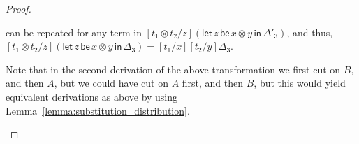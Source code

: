 \documentclass{elsarticle}
\newcommand{\FILLnt}[1]{\mathit{#1}}
\newcommand{\FILLmv}[1]{\mathit{#1}}
\newcommand{\FILLsym}[1]{#1}
\begin{document}
\begin{proof}
\begin{report}
\begin{itemize}
can be repeated for any term in $\FILLsym{[}   \FILLnt{t_{{\mathrm{1}}}}  \otimes  \FILLnt{t_{{\mathrm{2}}}}   \FILLsym{/}  \FILLmv{z}  \FILLsym{]}  \FILLsym{(}    \mathsf{let}\, \FILLmv{z} \,\mathsf{be}\,  \FILLmv{x}  \otimes  \FILLmv{y}  \,\mathsf{in}\, \Delta'_{{\mathrm{3}}}    \FILLsym{)}$, and thus, $\FILLsym{[}   \FILLnt{t_{{\mathrm{1}}}}  \otimes  \FILLnt{t_{{\mathrm{2}}}}   \FILLsym{/}  \FILLmv{z}  \FILLsym{]}  \FILLsym{(}    \mathsf{let}\, \FILLmv{z} \,\mathsf{be}\,  \FILLmv{x}  \otimes  \FILLmv{y}  \,\mathsf{in}\, \Delta_{{\mathrm{3}}}    \FILLsym{)}  \FILLsym{=}  \FILLsym{[}  \FILLnt{t_{{\mathrm{1}}}}  \FILLsym{/}  \FILLmv{x}  \FILLsym{]}  \FILLsym{[}  \FILLnt{t_{{\mathrm{2}}}}  \FILLsym{/}  \FILLmv{y}  \FILLsym{]}  \Delta_{{\mathrm{3}}}$.

Note that in the second derivation of the above transformation we
first cut on $\FILLnt{B}$, and then $\FILLnt{A}$, but we could have cut on
$\FILLnt{A}$ first, and then $\FILLnt{B}$, but this would yield equivalent
derivations as above by using
Lemma~\ref{lemma:substitution_distribution}.


\end{itemize}
\end{report}
\end{proof}
\end{document}
